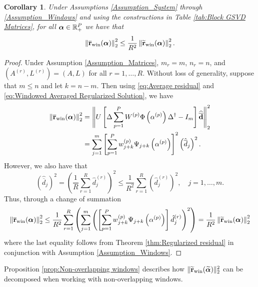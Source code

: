 \documentclass[12pt]{article}
\newtheorem{corollary}{Corollary}[theorem]
\begin{document}
\begin{corollary}
\label{cor:Averaged Residual}
Under Assumptions \ref{Assumption_System} through \ref{Assumption_Windows} and using the constructions in Table \ref{tab:Block GSVD Matrices}, for all $\bm{\alpha} \in \mathbb{R}_{+}^P$ we have that
\[\left\|\overline{\mathbf{r}}_{\text{win}}(\bm{\alpha})\right\|_2^2 \leq \frac{1}{R^2}\left\|\widetilde{\mathbf{r}}_{\text{win}}(\bm{\alpha})\right\|_2^2.\]
\end{corollary}
\begin{proof}
Under Assumption \ref{Assumption_Matrices}, $m_r = m$, $n_r = n$, and $(A^{(r)},L^{(r)}) = (A,L)$ for all $r = 1,\ldots,R$. Without loss of generality, suppose that $m \leq n$ and let $k = n - m$. Then using \eqref{eq:Average residual} and \eqref{eq:Windowed Averaged Regularized Solution}, we have
\begin{align*}
\left\|\overline{\mathbf{r}}_{\text{win}}(\bm{\alpha})\right\|_2^2 &= \left\|U\left[\Delta\sum_{p=1}^{P} W^{(p)}\Phi\left(\alpha^{(p)}\right){\Delta}^\dagger - I_m\right]\widehat{\overline{\mathbf{d}}}\right\|_2^2 \\
&= \sum_{j=1}^{m} \left[\sum_{p=1}^{P} w_{j+k}^{(p)}\Psi_{j+k}\left(\alpha^{(p)}\right)\right]^2 \left(\hat{\overline{d}}_j\right)^2.
\end{align*}
However, we also have that
\[\left(\hat{\overline{d}}_j\right)^2 = \left(\frac{1}{R} \sum_{r=1}^R \hat{d}_j^{(r)}\right)^2 \leq \frac{1}{R^2} \sum_{r=1}^R \left(\hat{d}_j^{(r)}\right)^2, \quad j = 1,\ldots,m.\]
Thus, through a change of summation
\[\left\|\overline{\mathbf{r}}_{\text{win}}(\bm{\alpha})\right\|_2^2 \leq \frac{1}{R^2}\sum_{r=1}^R \left(\sum_{j=1}^{m} \left(\left[\sum_{p=1}^{P} w_{j+k}^{(p)}\Psi_{j+k}\left(\alpha^{(p)}\right)\right] \hat{d}_j^{(r)}\right)^2\right) = \frac{1}{R^2}\left\|\widetilde{\mathbf{r}}_{\text{win}}(\bm{\alpha})\right\|_2^2\]
where the last equality follows from Theorem \ref{thm:Regularized residual} in conjunction with Assumption \ref{Assumption_Windows}.
\end{proof}

Proposition \ref{prop:Non-overlapping windows} describes how $\|\widetilde{\mathbf{r}}_{\text{win}}(\widetilde{\bm{\alpha}})\|_2^2$ can be decomposed when working with non-overlapping windows.
\end{document}
